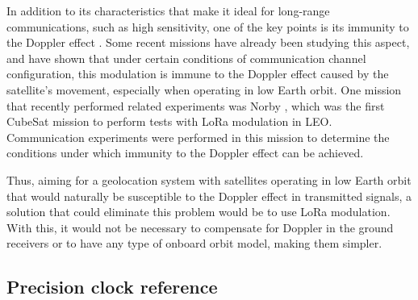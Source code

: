 In addition to its characteristics that make it ideal for long-range communications, such as high sensitivity, one of the key points is its immunity to the Doppler effect \cite{doroshkin2019} \cite{cao2021}. Some recent missions have already been studying this aspect, and have shown that under certain conditions of communication channel configuration, this modulation is immune to the Doppler effect caused by the satellite's movement, especially when operating in low Earth orbit. One mission that recently performed related experiments was Norby \cite{zadorozhny2022}, which was the first CubeSat mission to perform tests with LoRa modulation in LEO. Communication experiments were performed in this mission to determine the conditions under which immunity to the Doppler effect can be achieved.

Thus, aiming for a geolocation system with satellites operating in low Earth orbit that would naturally be susceptible to the Doppler effect in transmitted signals, a solution that could eliminate this problem would be to use LoRa modulation. With this, it would not be necessary to compensate for Doppler in the ground receivers or to have any type of onboard orbit model, making them simpler.

\subsection{Precision clock reference}





